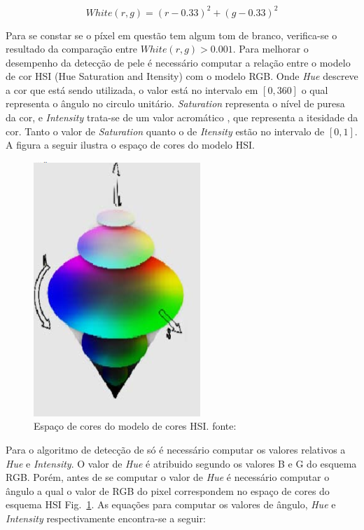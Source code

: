 \documentclass[journal,onecolumn]{IEEEtran}
\begin{document}
	\begin{equation}
		White(r,g) = (r - 0.33)^2 + (g - 0.33)^2 
		\label{eq:whiteValue}
	\end{equation}
	
	Para se constar se o píxel em questão tem algum tom de branco, verifica-se o resultado da comparação entre $White(r,g) > 0.001$.
	Para melhorar o desempenho da detecção de pele é necessário computar a relação entre o modelo de cor HSI (Hue Saturation and Itensity) com o modelo RGB.
	Onde \textit{Hue} descreve a cor que está sendo utilizada, o valor está no intervalo em $[0,360]$ o qual representa o ângulo no circulo unitário.
	\textit{Saturation} representa o nível de puresa da cor, e \textit{Intensity} trata-se de um valor acromático , que representa a itesidade da cor.
	Tanto o valor de \textit{Saturation} quanto o de \textit{Itensity} estão no intervalo de $[0,1]$.
	A figura a seguir ilustra o espaço de cores do modelo HSI. 

		\begin{figure}[htb]
		\begin{center}		
			\includegraphics[scale=0.3]{espaco_hsi.png}
			\caption{Espaço de cores do modelo de cores HSI. fonte:\cite{ibraheem2012understanding} }
			\label{fig:espacoCoresHSI}
		\end{center}
		\end{figure}
	
	Para o algoritmo de detecção de só é necessário computar os valores relativos a \textit{Hue} e \textit{Intensity}.
	O valor de \textit{Hue} é atribuido segundo os valores B e G do esquema RGB. 
	Porém, antes de se computar o valor de \textit{Hue} é necessário computar o ângulo a qual o valor de RGB do pixel correspondem no espaço de cores do esquema HSI Fig.~\ref{fig:espacoCoresHSI}.
	As equações para computar os valores de ângulo, \textit{Hue} e \textit{Intensity} respectivamente encontra-se a seguir:
	
\end{document}
